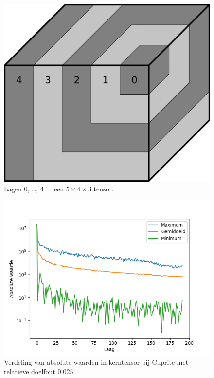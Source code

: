 \begin{figure}[H]
  \centering
  \includegraphics[scale=0.7]{images/core_tensor_layers.png}
  \caption{Lagen 0, \dots, 4 in een $5 \times 4 \times 3$ tensor.}
\label{fig:core-tensor-layers}
\end{figure}
\begin{figure}[H]
  \centering
  \includegraphics[scale=0.7]{images/core_tensor_values_distribution.png}
  \caption{Verdeling van absolute waarden in kerntensor bij Cuprite met relatieve doelfout 0.025.}
\label{fig:core-tensor-values-distribution}
\end{figure}

